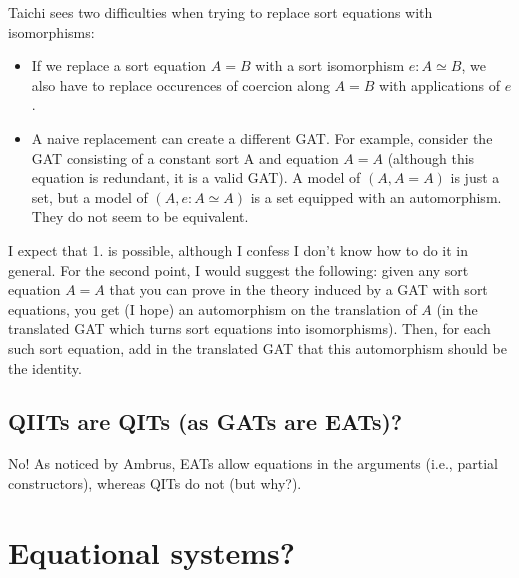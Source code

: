 \documentclass{article}
\begin{document}
Taichi sees two difficulties when trying to replace sort
equations with isomorphisms:
\begin{itemize}
\item If we replace a sort equation $A = B$ with a sort isomorphism $e : A \simeq B$, we also have to replace occurences of coercion along $A = B$ with
  applications of $e$.
  \item A naive replacement can create a different GAT. For
  example, consider the GAT consisting of a constant sort A and equation $A = A$
  (although this equation is redundant, it is a valid GAT). A model of
  $(A, A = A)$ is just a set, but a model of $(A, e : A \simeq A)$ is a set equipped with an
  automorphism. They do not seem to be equivalent.
\end{itemize}
I expect that 1. is possible, although I confess I don't know how to
do it in general.
For the second point, I would suggest the
following: given any sort equation $A = A$ that you can prove in the
theory induced by a GAT with sort equations, you get (I hope) an
automorphism on the translation of $A$ (in the translated GAT which
turns sort equations into isomorphisms). Then,  for each such sort
equation, add in the translated GAT that this automorphism should be
the identity.
\subsection{QIITs are QITs (as GATs are EATs)?}

No! As noticed by Ambrus, EATs allow equations in the arguments (i.e., partial
constructors), whereas QITs do not (but why?).
\section{Equational systems?}
\appendix
\end{document}
